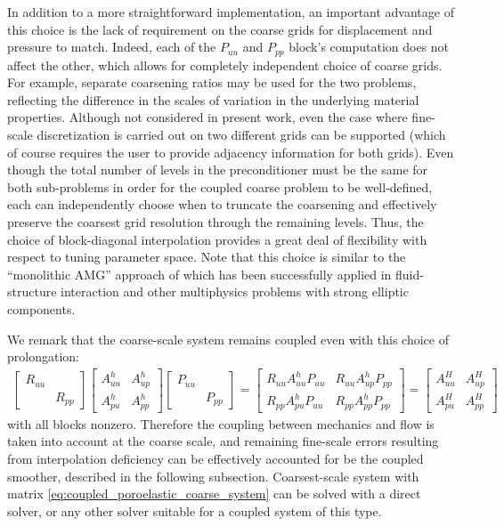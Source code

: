 In addition to a more straightforward implementation, an important advantage of this choice is the lack of requirement on the coarse grids for displacement and pressure to match.   Indeed, each of the $P_{uu}$ and $P_{pp}$ block's computation does not affect the other, which allows for completely independent choice of coarse grids.   For example, separate coarsening ratios may be used for the two problems, reflecting the difference in the scales of variation in the underlying material properties.   Although not considered in present work, even the case where fine-scale discretization is carried out on two different grids can be supported (which of course requires the user to provide adjacency information for both grids).   Even though the total number of levels in the preconditioner must be the same for both sub-problems in order for the coupled coarse problem to be well-defined, each can independently choose when to truncate the coarsening and effectively preserve the coarsest grid resolution through the remaining levels.   Thus, the choice of block-diagonal interpolation provides a great deal of flexibility with respect to tuning parameter space.   Note that this choice is similar to the ``monolithic AMG'' approach of \cite{Gee2011,Verdugo2016} which has been successfully applied in fluid-structure interaction and other multiphysics problems with strong elliptic components.

We remark that the coarse-scale system remains coupled even with this choice of prolongation:
\begin{align}
    \begin{bmatrix}
		R_{uu} &       \\
		       & R_{pp}
	\end{bmatrix}
	\begin{bmatrix}
		A_{uu}^h & A_{up}^h \\
		A_{pu}^h & A_{pp}^h
	\end{bmatrix}
	\begin{bmatrix}
	    P_{uu} &       \\
		       & P_{pp}
	\end{bmatrix} =
	\begin{bmatrix}
	    R_{uu} A_{uu}^h P_{uu} & R_{uu} A_{up}^h P_{pp} \\
	    R_{pp} A_{pu}^h P_{uu} & R_{pp} A_{pp}^h P_{pp}
	\end{bmatrix} =
	\begin{bmatrix}
		A_{uu}^H & A_{up}^H \\
		A_{pu}^H & A_{pp}^H
	\end{bmatrix}
	\label{eq:coupled_poroelastic_coarse_system}
\end{align}
with all blocks nonzero.   Therefore the coupling between mechanics and flow is taken into account at the coarse scale, and remaining fine-scale errors resulting from interpolation deficiency can be effectively accounted for be the coupled smoother, described in the following subsection.   Coarsest-scale system with matrix \cref{eq:coupled_poroelastic_coarse_system} can be solved with a direct solver, or any other solver suitable for a coupled system of this type.

